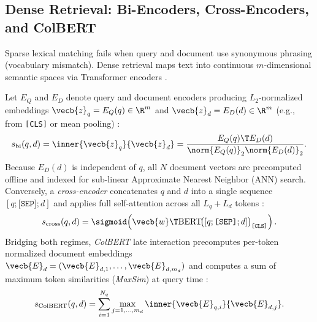 \documentclass[../../../../master.tex]{subfiles}
\begin{document}
\subsection{Dense Retrieval: Bi-Encoders, Cross-Encoders, and ColBERT}
\label{sec:rag:dense}

Sparse lexical matching fails when query and document use synonymous phrasing (vocabulary mismatch). Dense retrieval maps text into continuous $m$-dimensional semantic spaces via Transformer encoders .

\begin{coremath}
Let $E_Q$ and $E_D$ denote query and document encoders producing $L_2$-normalized embeddings $\vecb{z}_q = E_Q(q) \in \R^m$ and $\vecb{z}_d = E_D(d) \in \R^m$ (e.g., from \texttt{[CLS]} or mean pooling) :
\begin{equation}
  s_{\mathrm{bi}}(q, d) = \inner{\vecb{z}_q}{\vecb{z}_d} = \frac{E_Q(q)\T E_D(d)}{\norm{E_Q(q)}_2 \norm{E_D(d)}_2}.
  \label{eq:rag:biencoder}
\end{equation}
Because $E_D(d)$ is independent of $q$, all $N$ document vectors are precomputed offline and indexed for sub-linear Approximate Nearest Neighbor (ANN) search. Conversely, a \emph{cross-encoder} concatenates $q$ and $d$ into a single sequence $[q; \texttt{[SEP]}; d]$ and applies full self-attention across all $L_q + L_d$ tokens :
\begin{equation}
  s_{\mathrm{cross}}(q, d) = \sigmoid\!\left(\vecb{w}\T \mathrm{BERT}\!\big([q; \texttt{[SEP]}; d]\big)_{\texttt{[CLS]}}\right).
  \label{eq:rag:crossencoder}
\end{equation}
Bridging both regimes, \emph{ColBERT} late interaction precomputes per-token normalized document embeddings $\vecb{E}_{d} = (\vecb{E}_{d,1}, \dots, \vecb{E}_{d,m_d})$ and computes a sum of maximum token similarities (\emph{MaxSim}) at query time :
\begin{equation}
  s_{\mathrm{ColBERT}}(q, d) = \sum_{i=1}^{N_q} \max_{j=1,\dots,m_d} \inner{\vecb{E}_{q,i}}{\vecb{E}_{d,j}}.
  \label{eq:rag:colbert}
\end{equation}
\end{coremath}

\end{document}
